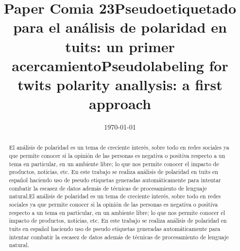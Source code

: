 \documentclass[a4paper]{llncs}
\date{\today}
\title{Paper Comia 23}
\begin{document}
  \title{Pseudoetiquetado para el análisis de polaridad en tuits: un primer
    acercamiento}



  \maketitle

\begin{abstract}
El análisis de polaridad es un tema de creciente interés, sobre todo en redes
sociales ya que permite conocer si la opinión de las personas es negativa o
positiva respecto a un tema en particular, en un ambiente libre; lo que nos
permite conocer el impacto de productos, noticias, etc. En este trabajo se
realiza análisis de polaridad en tuits en español haciendo uso de pseudo
etiquetas generadas automáticamente para intentar combatir la escasez de datos
además de técnicas de procesamiento de lenguaje natural.El análisis de polaridad
es un tema de creciente interés, sobre todo en redes sociales ya que permite
conocer si la opinión de las personas es negativa o positiva respecto a un tema
en particular, en un ambiente libre; lo que nos permite conocer el impacto de
productos, noticias, etc. En este trabajo se realiza análisis de polaridad en
tuits en español haciendo uso de pseudo etiquetas generadas automáticamente
para intentar combatir la escasez de datos además de técnicas de procesamiento
de lenguaje natural.
\end{abstract}

  \title{Pseudolabeling for twits polarity anallysis: a first approach}


\end{document}
